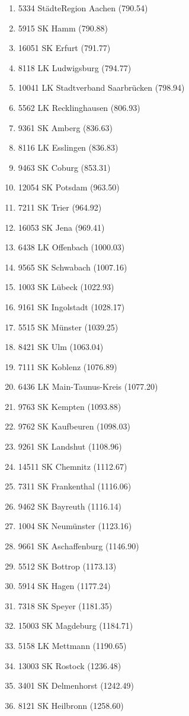 \begin{enumerate}[itemsep=-6mm]
\item 5334 StädteRegion Aachen (790.54)
\item 5915 SK Hamm (790.88)
\item 16051 SK Erfurt (791.77)
\item 8118 LK Ludwigsburg (794.77)
\item 10041 LK Stadtverband Saarbrücken (798.94)
\item 5562 LK Recklinghausen (806.93)
\item 9361 SK Amberg (836.63)
\item 8116 LK Esslingen (836.83)
\item 9463 SK Coburg (853.31)
\item 12054 SK Potsdam (963.50)
\item 7211 SK Trier (964.92)
\item 16053 SK Jena (969.41)
\item 6438 LK Offenbach (1000.03)
\item 9565 SK Schwabach (1007.16)
\item 1003 SK Lübeck (1022.93)
\item 9161 SK Ingolstadt (1028.17)
\item 5515 SK Münster (1039.25)
\item 8421 SK Ulm (1063.04)
\item 7111 SK Koblenz (1076.89)
\item 6436 LK Main-Taunus-Kreis (1077.20)
\item 9763 SK Kempten (1093.88)
\item 9762 SK Kaufbeuren (1098.03)
\item 9261 SK Landshut (1108.96)
\item 14511 SK Chemnitz (1112.67)
\item 7311 SK Frankenthal (1116.06)
\item 9462 SK Bayreuth (1116.14)
\item 1004 SK Neumünster (1123.16)
\item 9661 SK Aschaffenburg (1146.90)
\item 5512 SK Bottrop (1173.13)
\item 5914 SK Hagen (1177.24)
\item 7318 SK Speyer (1181.35)
\item 15003 SK Magdeburg (1184.71)
\item 5158 LK Mettmann (1190.65)
\item 13003 SK Rostock (1236.48)
\item 3401 SK Delmenhorst (1242.49)
\item 8121 SK Heilbronn (1258.60)

\end{enumerate}
